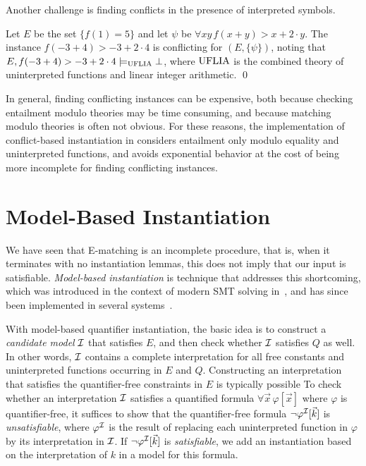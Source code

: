 \documentclass[oribibl]{llncs}
\begin{document}
Another challenge is finding conflicts in the presence of interpreted symbols.
\begin{example}
Let $E$ be the set $\{ f( 1 ) = 5 \}$ and let $\psi$ be $\forall xy\, f( x + y ) > x + 2 \cdot y$.
The instance $f( -3 + 4 ) > -3 + 2 \cdot 4$ is conflicting for $( E, \{ \psi \} )$,
noting that $E, f( -3 + 4 ) > -3 + 2 \cdot 4 \models_{\mathrm{UFLIA}} \bot$, where $\mathrm{UFLIA}$ is the combined
theory of uninterpreted functions and linear integer arithmetic.
\qed
\end{example}
In general, finding conflicting instances can be expensive, both because checking entailment modulo theories may be time consuming,
and because matching modulo theories is often not obvious.
For these reasons,
the implementation of conflict-based instantiation in \cvc
considers entailment only modulo equality and uninterpreted functions,
and avoids exponential behavior at the cost of being more incomplete for finding conflicting instances. 

\section{Model-Based Instantiation}
\label{sec:mbqi}

We have seen that E-matching is an incomplete procedure,
that is, when it terminates with no instantiation lemmas, this does not imply that our input is satisfiable.
\emph{Model-based instantiation} is technique that addresses this shortcoming,
which was introduced in the context of modern SMT solving in~\cite{GeDeM-CAV-09},
and has since been implemented in several systems~\cite{Jacobs09,ReyEtAl-CADE-13}.

With model-based quantifier instantiation, the basic idea is
to construct a \emph{candidate model} $\mathcal{I}$ that satisfies $E$, 
and then check whether $\mathcal{I}$ satisfies $Q$ as well.
In other words, $\mathcal{I}$ contains a complete interpretation for all free constants and uninterpreted functions occurring in $E$ and $Q$.
Constructing an interpretation that satisfies the quantifier-free constraints in $E$
is typically possible 
To check whether an interpretation $\mathcal{I}$ satisfies a quantified formula $\forall \vec x\, \varphi[ \vec x ]$ where $\varphi$ is quantifier-free,
it suffices to show that the quantifier-free formula $\neg \varphi^{\mathcal{I}}[ \vec k ]$ is \emph{unsatisfiable},
where $\varphi^{\mathcal{I}}$ is the result of replacing each uninterpreted function in $\varphi$
by its interpretation in $\mathcal{I}$.
If $\neg \varphi^{\mathcal{I}}[ \vec k ]$ is \emph{satisfiable}, we add an instantiation based on the interpretation of $k$ in a model
for this formula.
\end{document}
